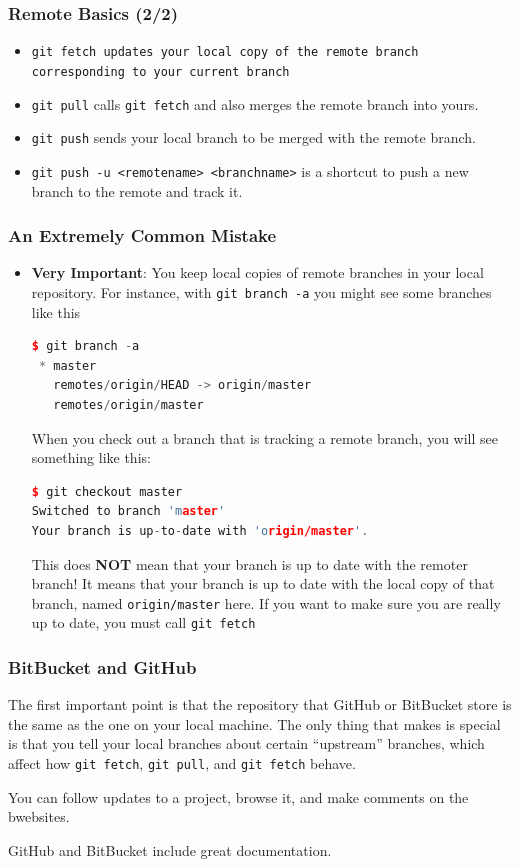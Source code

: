 \documentclass{beamer}
\begin{document}
\begin{frame}[fragile]
\frametitle{Remote Basics (2/2)}
\begin{itemize}
\item \lstinline{git fetch updates your local copy of the remote branch corresponding to your current branch}
\item \lstinline{git pull} calls \lstinline{git fetch} and also merges the remote branch into yours.
\item \lstinline{git push} sends your local branch to be merged with the remote branch.
\item \lstinline{git push -u <remotename> <branchname>} is a shortcut to push a new branch to the remote and track it.
\end{itemize}
\end{frame}

\begin{frame}[fragile]
\frametitle{An Extremely Common Mistake}
\begin{itemize}
\item \textbf{Very Important}: You keep local copies of remote branches in your local repository. For instance, with \lstinline{git branch -a} you might see some branches like this
\begin{lstlisting}[language=C++]
$ git branch -a
 * master
   remotes/origin/HEAD -> origin/master
   remotes/origin/master
\end{lstlisting}
When you check out a branch that is tracking a remote branch, you will see something like this:
\begin{lstlisting}[language=C++]
$ git checkout master
Switched to branch 'master'
Your branch is up-to-date with 'origin/master'.
\end{lstlisting}
This does \textbf{NOT} mean that your branch is up to date with the remoter branch! It means that your branch is up to date with the local copy of that branch, named \lstinline{origin/master} here.
If you want to make sure you are really up to date, you must call \lstinline{git fetch}
\end{itemize}
\end{frame}

\begin{frame}[fragile]
\frametitle{BitBucket and GitHub}
The first important point is that the repository that GitHub or BitBucket store is the same as the one on your local machine. The only thing that makes is special is that you tell your local branches about certain ``upstream'' branches, which affect how \lstinline{git fetch}, \lstinline{git pull}, and \lstinline{git fetch} behave.

You can follow updates to a project, browse it, and make comments on the bwebsites.

GitHub and BitBucket include great documentation.
\end{frame}
\end{document}
